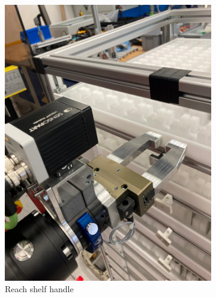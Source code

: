 
\begin{figure}[h]
    \centering
    \begin{subfigure}[b]{0.32\textwidth}
        \centering
        \includegraphics[width=\textwidth]{figures/shelf-control/reach-handle.jpeg}
        \caption{Reach shelf handle}
        \label{subfig:reach-handle}
    \end{subfigure}\hspace{0.1cm}
    \begin{subfigure}[b]{0.32\textwidth}
        \centering

\end{subfigure}
\end{figure}
